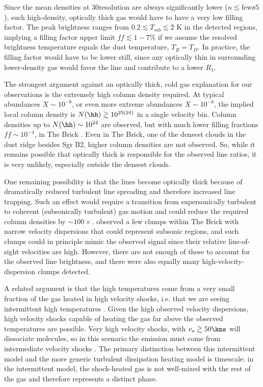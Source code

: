 Since the mean densities at 30\arcsec resolution are always significantly lower
($n\lesssim\mathrm{few}\ee{5}$ \percc), such high-density,
optically thick gas would have to have a very low filling factor.  The peak
\para \threeohthree brightness ranges from $0.2 \lesssim T_{mb} \lesssim 2$ K
in the detected regions, implying a filling factor upper limit $ff\lesssim 1-7\%$ if
we assume the resolved brightness temperature equals the dust temperature,
$T_B=T_D$.
In practice, the filling factor would have to be lower still, since any
optically thin \para in surrounding lower-density gas would favor the
\threeohthree line and contribute to a lower $R_1$.

The strongest argument against an optically thick, cold gas explanation for our
observations is the extremely high column
density required.  At typical \para abundances $X\sim10^{-9}$, or even more
extreme abundances $X\sim10^{-8}$, the implied local column density is
$N(\hh)\gtrsim10^{25(24)}$ \persc in a single velocity bin.  Column densities
up to $N(\hh)\sim10^{24}$ \persc are observed, but with much lower filling
fractions $ff\sim10^{-4}$, in The Brick \citep[][their Figure
4]{Rathborne2014b}.  Even in The Brick, one of the densest clouds in the
dust ridge besides Sgr B2, higher column densities are not observed.  So, while
it remains possible that optically thick
\para is responsible for the observed line ratios, it is very unlikely,
especially outside the densest clouds.

One remaining possibility is that the \para lines become optically thick
because of dramatically reduced turbulent line spreading and therefore
increased line trapping.  Such an effect would require a transition from
supersonically turbulent to coherent (subsonically turbulent) gas motion
\citep[e.g.,][]{Pineda2010a} and could reduce the required column densities by
$\sim100\times$.   \citet{Kauffmann2013a} observed a few clumps within The
Brick with narrow velocity dispersions that could represent subsonic regions,
and such clumps could in principle mimic the observed signal since their
relative line-of-sight velocities are high.  However, there are not enough of
these to account for the observed line brightness, and there were also equally
many high-velocity-dispersion clumps detected. 

A related argument is that the high temperatures come from a very small
fraction of the gas heated in high velocity shocks, i.e. that we are seeing
intermittent high temperatures \citep[e.g.,][]{Falgarone1995a}.  Given the high
observed velocity dispersions, high velocity shocks capable of heating the gas
far above the observed temperatures are possible.  Very high velocity shocks,
with $v_s \gtrsim 50 \kms$ will dissociate molecules, so in this scenario the
emission must come from intermediate velocity shocks \citep{Neufeld1989a}.  The
primary distinction between this intermittent model and the more generic
turbulent dissipation heating model is timescale: in the intermittent model,
the shock-heated gas is not well-mixed with the rest of the gas and therefore
represents a distinct phase.  

